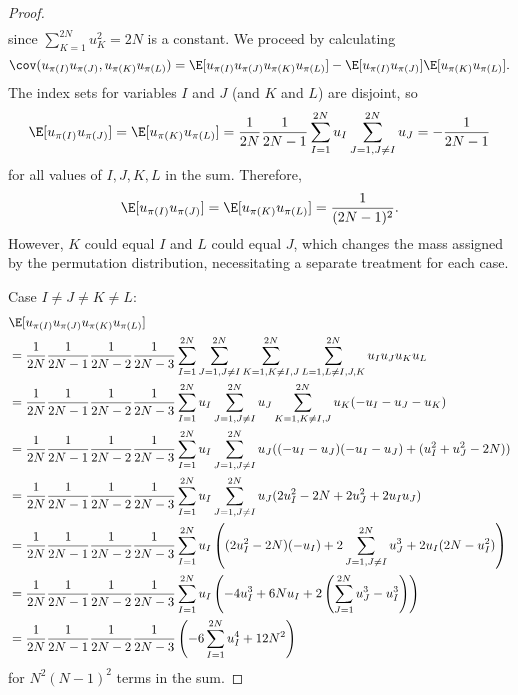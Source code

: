 \begin{proof}
\begin{align*}
  \end{align*}
  since $\sum_{K=1}^{2N}u_K^2 = 2N$ is a constant.  We proceed by calculating
  \begin{equation*}
    \cov(u_{\pi(I)}u_{\pi(J)},u_{\pi(K)}u_{\pi(L)}) 
    = \E[u_{\pi(I)}u_{\pi(J)}u_{\pi(K)}u_{\pi(L)}] - \E[u_{\pi(I)}u_{\pi(J)}]\E[u_{\pi(K)}u_{\pi(L)}].
  \end{equation*}
  The index sets for variables $I$ and $J$ (and $K$ and $L$) are disjoint, so 
  \begin{equation*}
    \E[u_{\pi(I)}u_{\pi(J)}] = \E[u_{\pi(K)}u_{\pi(L)}]
    = \frac{1}{2N}\frac{1}{2N-1}\sum_{I=1}^{2N} u_{I} \sum_{J=1,J\neq I}^{2N} u_{J} = -\frac{1}{2N-1}
  \end{equation*}
  for all values of $I, J, K, L$ in the sum.  Therefore, 
  \begin{equation*}
    \E[u_{\pi(I)}u_{\pi(J)}] = \E[u_{\pi(K)}u_{\pi(L)}] = \frac{1}{(2N-1)^2}.
  \end{equation*}
  However, $K$ could equal $I$ and $L$ could equal $J$, which changes the mass assigned by the
  permutation distribution, necessitating a separate treatment for each case.

  Case $I \neq J \neq K \neq L$: 
  \begin{align*}
    &\E[u_{\pi(I)} u_{\pi(J)} u_{\pi(K)} u_{\pi(L)}] \\
    &= \frac{1}{2N}\frac{1}{2N-1}\frac{1}{2N-2}\frac{1}{2N-3} 
    \sum_{I=1}^{2N} \sum_{J=1, J\neq I}^{2N} \sum_{K=1, K \neq I,J}^{2N} \sum_{L=1, L \neq I,J,K}^{2N} 
    u_{I} u_{J} u_{K} u_{L} \\
    &= \frac{1}{2N}\frac{1}{2N-1}\frac{1}{2N-2}\frac{1}{2N-3} 
    \sum_{I=1}^{2N} u_{I} \sum_{J=1, J\neq I}^{2N} u_{J} \sum_{K=1, K \neq
      I,J}^{2N} u_{K} (-u_{I}-u_{J}-u_{K}) \\
    &= \frac{1}{2N}\frac{1}{2N-1}\frac{1}{2N-2}\frac{1}{2N-3} 
    \sum_{I=1}^{2N} u_{I} \sum_{J=1, J\neq I}^{2N} u_{J} 
    ((-u_{I}-u_{J})(-u_{I}-u_{J})+(u_{I}^2+u_{J}^2-2N)) \\
    &= \frac{1}{2N}\frac{1}{2N-1}\frac{1}{2N-2}\frac{1}{2N-3} 
    \sum_{I=1}^{2N} u_{I} \sum_{J=1, J\neq I}^{2N} u_{J} 
    (2u_{I}^2-2N+2u_{J}^2+2u_{I}u_{J}) \\
    &= \frac{1}{2N}\frac{1}{2N-1}\frac{1}{2N-2}\frac{1}{2N-3} 
    \sum_{I=1}^{2N} u_{I} \left ( 
      (2u_{I}^2-2N)(-u_{I})+2\sum_{J=1, J\neq I}^{2N} u_{J}^3+2u_{I}(2N-u_{I}^2) 
    \right) \\
    &= \frac{1}{2N}\frac{1}{2N-1}\frac{1}{2N-2}\frac{1}{2N-3} 
    \sum_{I=1}^{2N} u_{I} \left ( 
      -4u_{I}^3 + 6Nu_{I} + 2\left (\sum_{J=1}^{2N}u_{J}^3 - u_{I}^3 \right )
    \right) \\
    &= \frac{1}{2N}\frac{1}{2N-1}\frac{1}{2N-2}\frac{1}{2N-3} 
    \left ( -6\sum_{I=1}^{2N}u_{I}^4+12N^2 \right )
  \end{align*}
  for $N^2(N-1)^2$ terms in the sum.
  

\end{proof}
